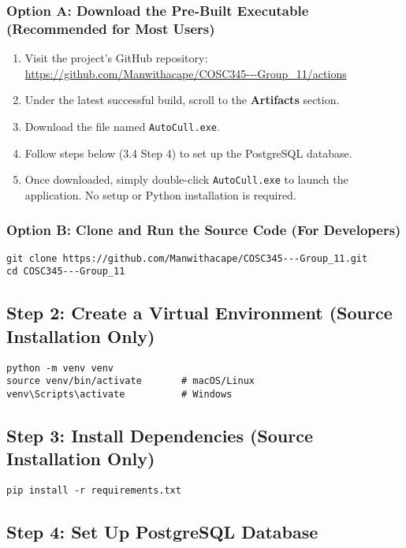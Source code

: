\documentclass[12pt,a4paper]{article}
\begin{document}
\subsubsection*{Option A: Download the Pre-Built Executable (Recommended for Most Users)}
\begin{enumerate}[label=\arabic*.]
    \item Visit the project's GitHub repository:  
    \url{https://github.com/Manwithacape/COSC345---Group_11/actions}
    \item Under the latest successful build, scroll to the \textbf{Artifacts} section.
    \item Download the file named \texttt{AutoCull.exe}.
    \item Follow steps below (3.4 Step 4) to set up the PostgreSQL database.
    \item Once downloaded, simply double-click \texttt{AutoCull.exe} to launch the application.  
    No setup or Python installation is required.
\end{enumerate}

\subsubsection*{Option B: Clone and Run the Source Code (For Developers)}
\begin{lstlisting}[style=console]
git clone https://github.com/Manwithacape/COSC345---Group_11.git
cd COSC345---Group_11
\end{lstlisting}

\subsection{Step 2: Create a Virtual Environment (Source Installation Only)}
\begin{lstlisting}[style=console]
python -m venv venv
source venv/bin/activate       # macOS/Linux
venv\Scripts\activate          # Windows
\end{lstlisting}

\subsection{Step 3: Install Dependencies (Source Installation Only)}
\begin{lstlisting}[style=console]
pip install -r requirements.txt
\end{lstlisting}

\subsection{Step 4: Set Up PostgreSQL Database}
\end{document}
